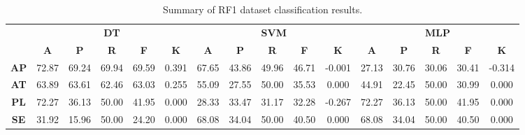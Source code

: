 \begin{landscape}
\begin{table}[htbp]
\footnotesize
\centering
\caption{Summary of RF1 dataset classification results.}
\label{tab:base_female}
\begin{tabular}{|c|c|c|c|c|c|c|c|c|c|c|c|c|c|c|c|}
\hline
\multirow{2}{*}{}	& \multicolumn{5}{c|}{\textbf{DT}}												& \multicolumn{5}{c|}{\textbf{SVM}}												& \multicolumn{5}{c|}{\textbf{MLP}}												\\ \cline{2-16} 
					& \textbf{A}	& \textbf{P}	& \textbf{R}	& \textbf{F}	& \textbf{K}	& \textbf{A}	& \textbf{P}	& \textbf{R}	& \textbf{F}	& \textbf{K}	& \textbf{A}	& \textbf{P}	& \textbf{R}	& \textbf{F}	& \textbf{K}	\\ \hline
\textbf{AP}			& 72.87			& 69.24			& 69.94			& 69.59			& 0.391			& 67.65			& 43.86			& 49.96			& 46.71			& -0.001			& 27.13			& 30.76			& 30.06			& 30.41			& -0.314			\\ \hline
\textbf{AT}			& 63.89			& 63.61			& 62.46			& 63.03			& 0.255			& 55.09			& 27.55			& 50.00			& 35.53			& 0.000			& 44.91			& 22.45			& 50.00			& 30.99			& 0.000			\\ \hline
\textbf{PL}			& 72.27			& 36.13			& 50.00			& 41.95			& 0.000			& 28.33			& 33.47			& 31.17			& 32.28			& -0.267			& 72.27			& 36.13			& 50.00			& 41.95			& 0.000			\\ \hline
\textbf{SE}			& 31.92			& 15.96			& 50.00			& 24.20			& 0.000			& 68.08			& 34.04			& 50.00			& 40.50			& 0.000			& 68.08			& 34.04			& 50.00			& 40.50			& 0.000			\\ \hline
\end{tabular}
\end{table}
\end{landscape}